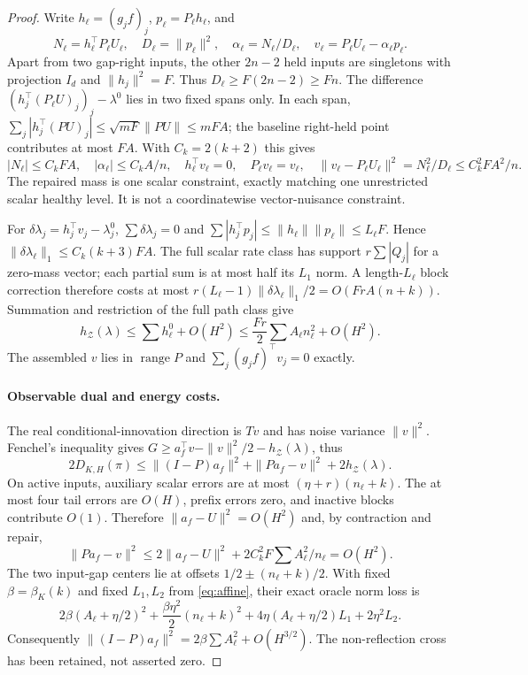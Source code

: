 \documentclass[11pt]{article}
\begin{document}
\begin{proof}
Write $h_\ell=(g_jf)_j$, $p_\ell=P_\ell h_\ell$, and
\[
N_\ell=h_\ell^\top P_\ell U_\ell,\quad
D_\ell=\|p_\ell\|^2,\quad \alpha_\ell=N_\ell/D_\ell,\quad
v_\ell=P_\ell U_\ell-\alpha_\ell p_\ell .
\]
Apart from two gap-right inputs, the other $2n-2$ held inputs are singletons
with projection $I_d$ and $\|h_j\|^2=F$.
Thus $D_\ell\ge F(2n-2)\ge Fn$.
The difference $(h_j^\top(P_\ell U)_j)_j-\lambda^0$ lies in two fixed
spans only. In each span,
$\sum_j|h_j^\top(PU)_j|\le\sqrt{mF}\|PU\|\le mFA$;
the baseline right-held point contributes at most $FA$.
With $C_k=2(k+2)$ this gives
\[
|N_\ell|\le C_kFA,\quad |\alpha_\ell|\le C_kA/n,\quad
h_\ell^\top v_\ell=0,\quad P_\ell v_\ell=v_\ell,\quad
\|v_\ell-P_\ell U_\ell\|^2=N_\ell^2/D_\ell\le C_k^2FA^2/n .
\]
The repaired mass is one scalar constraint, exactly matching one unrestricted
scalar healthy level. It is not a coordinatewise vector-nuisance constraint.

For $\delta\lambda_j=h_j^\top v_j-\lambda_j^0$,
$\sum\delta\lambda_j=0$ and
$\sum|h_j^\top p_j|\le\|h_\ell\|\|p_\ell\|\le L_\ell F$.
Hence $\|\delta\lambda_\ell\|_1\le C_k(k+3)FA$.
The full scalar rate class has support $r\sum|Q_j|$ for a zero-mass vector;
each partial sum is at most half its $L_1$ norm.
A length-$L_\ell$ block correction therefore costs
at most $r(L_\ell-1)\|\delta\lambda_\ell\|_1/2=O(FrA(n+k))$.
Summation and restriction of the full path class give
\begin{equation}\label{eq:support}
h_{\mathcal Z}(\lambda)\le\sum h_\ell^0+O(H^2)
\le\frac{Fr}{2}\sum A_\ell n_\ell^2+O(H^2).
\end{equation}
The assembled $v$ lies in $\operatorname{range}P$ and
$\sum_j(g_jf)^\top v_j=0$ exactly.

\paragraph{Observable dual and energy costs.}
The real conditional-innovation direction is $Tv$ and has noise variance
$\|v\|^2$. Fenchel's inequality gives
$G\ge a_f^\top v-\|v\|^2/2-h_{\mathcal Z}(\lambda)$, thus
\begin{equation}\label{eq:dual}
2D_{K,H}(\pi)\le
\|(I-P)a_f\|^2+\|Pa_f-v\|^2+2h_{\mathcal Z}(\lambda).
\end{equation}
On active inputs, auxiliary scalar errors are at most $(\eta+r)(n_\ell+k)$.
The at most four tail errors are $O(H)$, prefix errors zero, and inactive
blocks contribute $O(1)$.
Therefore $\|a_f-U\|^2=O(H^2)$ and, by contraction and repair,
\[
\|Pa_f-v\|^2\le2\|a_f-U\|^2+2C_k^2F\sum A_\ell^2/n_\ell=O(H^2).
\]
The two input-gap centers lie at offsets $1/2\pm(n_\ell+k)/2$.
With fixed $\beta=\beta_K(k)$ and fixed $L_1,L_2$ from \eqref{eq:affine},
their exact oracle norm loss is
\[
2\beta(A_\ell+\eta/2)^2+\frac{\beta\eta^2}{2}(n_\ell+k)^2
+4\eta(A_\ell+\eta/2)L_1+2\eta^2L_2 .
\]
Consequently $\|(I-P)a_f\|^2=2\beta\sum A_\ell^2+O(H^{3/2})$.
The non-reflection cross has been retained, not asserted zero.


\end{proof}
\end{document}
